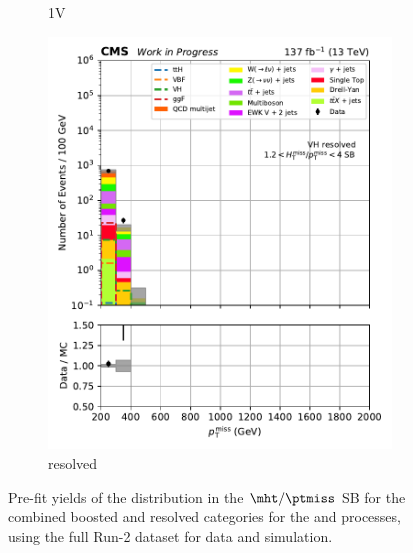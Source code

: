\begin{figure}[htbp]
\begin{subfigure}[b]{0.24\textwidth}
        \caption{\VH 1V}
    \end{subfigure}
    \hfill
    \begin{subfigure}[b]{0.24\textwidth}
        \includegraphics[width=\textwidth]{figures/region_plots/2016to18/sideband_2/VH_resolved.pdf}
        \caption{\VH resolved}
    \end{subfigure}
    \caption[Pre-fit yields of the \ptmiss distribution in the $\mht/\ptmiss$ sideband for the combined boosted and resolved categories for the \ttH and \VH processes, using the full Run-2 dataset for data and simulation]{Pre-fit yields of the \ptmiss distribution in the $\mht/\ptmiss$ \gls{SB} for the combined boosted and resolved categories for the \ttH and \VH processes, using the full Run-2 dataset for data and simulation.}
    \label{fig:htoinv_sb_yields_comb2016to18_mht_met}
\end{figure}

